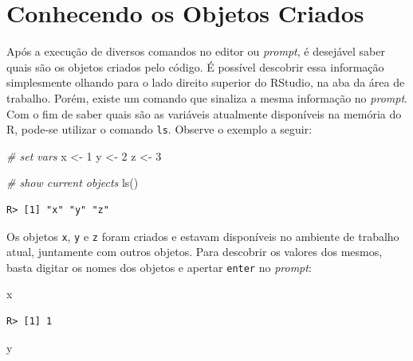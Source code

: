 \documentclass[
  11pt,
]{book}
\newenvironment{Shaded}{\begin{snugshade}}{\end{snugshade}}
\newcommand{\CommentTok}[1]{\textcolor[rgb]{0.37,0.37,0.37}{\textit{#1}}}
\newcommand{\DecValTok}[1]{\textcolor[rgb]{0.06,0.06,0.06}{#1}}
\newcommand{\FunctionTok}[1]{\textcolor[rgb]{0,0,0}{#1}}
\newcommand{\NormalTok}[1]{#1}
\newcommand{\OtherTok}[1]{\textcolor[rgb]{0.37,0.37,0.37}{#1}}
\begin{document}
\hypertarget{conhecendo-os-objetos-criados}{%
\section{Conhecendo os Objetos Criados}\label{conhecendo-os-objetos-criados}}

Após a execução de diversos comandos no editor ou \emph{prompt}, é desejável saber quais são os objetos criados pelo código. É possível descobrir essa informação simplesmente olhando para o lado direito superior do RStudio, na aba da área de trabalho. Porém, existe um comando que sinaliza a mesma informação no \emph{prompt}. Com o fim de saber quais são as variáveis atualmente disponíveis na memória do R, pode-se utilizar o comando \texttt{ls}. Observe o exemplo a seguir: 

\begin{Shaded}
\begin{Highlighting}[]
\CommentTok{\# set vars}
\NormalTok{x }\OtherTok{\textless{}{-}} \DecValTok{1}
\NormalTok{y }\OtherTok{\textless{}{-}} \DecValTok{2}
\NormalTok{z }\OtherTok{\textless{}{-}} \DecValTok{3}

\CommentTok{\# show current objects}
\FunctionTok{ls}\NormalTok{()}
\end{Highlighting}
\end{Shaded}

\begin{verbatim}
R> [1] "x" "y" "z"
\end{verbatim}

Os objetos \texttt{x}, \texttt{y} e \texttt{z} foram criados e estavam disponíveis no ambiente de trabalho atual, juntamente com outros objetos. Para descobrir os valores dos mesmos, basta digitar os nomes dos objetos e apertar \texttt{enter} no \emph{prompt}:

\begin{Shaded}
\begin{Highlighting}[]
\NormalTok{x}
\end{Highlighting}
\end{Shaded}

\begin{verbatim}
R> [1] 1
\end{verbatim}

\begin{Shaded}
\begin{Highlighting}[]
\NormalTok{y}
\end{Highlighting}
\end{Shaded}
\end{document}
